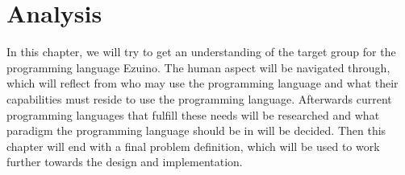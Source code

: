 \chapter{Analysis}\label{ch:ch2label}
In this chapter, we will try to get an understanding of the target group for the programming language Ezuino. The human aspect will be navigated through, which will reflect from who may use the programming language and what their capabilities must reside to use the programming language. Afterwards current programming languages that fulfill these needs will be researched and what paradigm the programming language should be in will be decided. Then this chapter will end with a final problem definition, which will be used to work further towards the design and implementation.